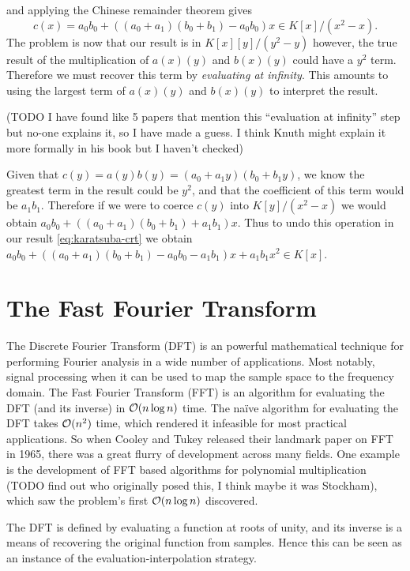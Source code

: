 and applying the Chinese remainder theorem gives
\begin{equation}\label{eq:karatsuba-crt}
    c(x) = a_0b_0 + ((a_0 + a_1)(b_0 + b_1) - a_0b_0)x \in K[x]/(x^2 - x).
\end{equation}
The problem is now that our result is in $K[x][y]/(y^2 - y)$ however, the true result of the multiplication of $a(x)(y)$ and $b(x)(y)$ could have a $y^2$ term. Therefore we must recover this term by \emph{evaluating at infinity}. This amounts to using the largest term of $a(x)(y)$ and $b(x)(y)$ to interpret the result.

\medskip 

(TODO I have found like 5 papers that mention this ``evaluation at infinity'' step but no-one explains it, so I have made a guess. I think Knuth might explain it more formally in his book but I haven't checked)

\medskip 

Given that $c(y) = a(y)b(y) = (a_0 + a_1y)(b_0 + b_1 y)$, we know the greatest term in the result could be $y^2$, and that the coefficient of this term would be $a_1b_1$. Therefore if we were to coerce $c(y)$ into $K[y]/(x^2 - x)$ we would obtain $a_0b_0 + ((a_0 + a_1)(b_0 + b_1) + a_1b_1)x$. Thus to undo this operation in our result \eqref{eq:karatsuba-crt} we obtain $a_0b_0 + ((a_0 + a_1)(b_0 + b_1) - a_0b_0 - a_1b_1)x + a_1b_1x^2 \in K[x]$.

\section{The Fast Fourier Transform}

The Discrete Fourier Transform (DFT) is an powerful mathematical technique for performing Fourier analysis in a wide number of applications. Most notably, signal processing when it can be used to map the sample space to the frequency domain. The Fast Fourier Transform (FFT) is an algorithm for evaluating the DFT (and its inverse) in $\mathcal O(n \log n)$ time. The na\"{i}ve algorithm for evaluating the DFT takes $\mathcal O(n^2)$ time, which rendered it infeasible for most practical applications. So when Cooley and Tukey released their landmark paper on FFT in 1965, there was a great flurry of development across many fields. One example is the development of FFT based algorithms for polynomial multiplication (TODO find out who originally posed this, I think maybe it was Stockham), which saw the problem's first $\mathcal O(n \log n)$ discovered.

The DFT is defined by evaluating a function at roots of unity, and its inverse is a means of recovering the original function from samples. Hence this can be seen as an instance of the evaluation-interpolation strategy. 

